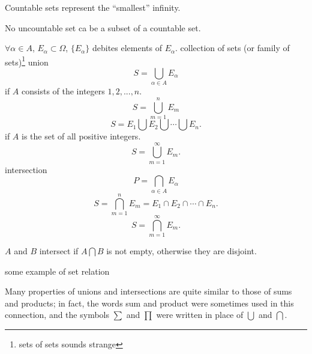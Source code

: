 Countable sets represent the ``smallest'' infinity.

No uncountable set ca be a subset of a countable set.


\begin{myDef}\label{myDef:2.9 union_intersection}
    $\forall \alpha\in A$, $E_\alpha \subset \Omega$, $\{E_\alpha\}$ debites elements of $E_\alpha$. collection of sets (or family of sets)\footnote{sets of sets sounds strange}    
    union
    \begin{equation}\label{eq:2.1 union}
        S = \bigcup_{\alpha\in A} E_\alpha
    \end{equation}
    if $A$ consists of the integers $1,2,...,n$.
    \begin{equation}\label{eq:2.2 union finite}
        S = \bigcup_{m=1}^n E_m
    \end{equation}
    \begin{equation}\label{eq:2.3 union finite2}
        S = E_1 \bigcup E_2 \bigcup \cdots \bigcup E_n.
    \end{equation}
    if $A$ is the set of all positive integers.
    \begin{equation}\label{eq:2.4 union countable}
        S = \bigcup_{m=1}^{\infty} E_m.
    \end{equation}
    intersection
    \begin{equation}\label{eq:2.5 intersection}
        P = \bigcap_{\alpha\in A} E_\alpha
    \end{equation}
    \begin{equation}\label{eq:2.6 intersection finite}
        S = \bigcap_{m=1}^n E_m = E_1 \cap E_2 \cap \cdots \cap E_n.
    \end{equation}
    \begin{equation}\label{eq:2.7 intersection countable}
        S = \bigcap_{m=1}^{\infty} E_m.
    \end{equation}

    $A$ and $B$ intersect if $A\bigcap B$ is not empty, otherwise they are disjoint.
\end{myDef}

\begin{myExample}
    some example of set relation
\end{myExample}

\begin{myRemark}
    Many properties of unions and intersections are quite similar to those of sums and products; in fact, the words sum and product were sometimes used in this connection, and the symbols $\sum$ and $\prod$ were written in place of $\bigcup$ and $\bigcap$.
\end{myRemark}

